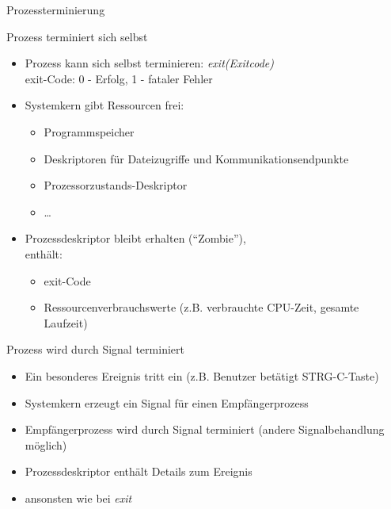 \documentclass[utf8,9pt]{beamer}
\begin{document}
\begin{frame}{Prozessterminierung}{}

  \begin{block}{\small Prozess terminiert sich selbst}
    \begin{itemize}
    \footnotesize
    \item Prozess kann sich selbst terminieren:
      {\em  exit(Exitcode) \/}\\
      exit-Code: 0 - Erfolg, 1 - fataler Fehler
    \item Systemkern gibt Ressourcen frei:
      \begin{itemize}
    \footnotesize
      \item Programmspeicher
      \item Deskriptoren für Dateizugriffe und Kommunikationsendpunkte
      \item Prozessorzustands-Deskriptor
      \item \dots
      \end{itemize}
    \item Prozessdeskriptor bleibt erhalten ("`Zombie"'),\\
      enthält:
      \begin{itemize}
    \footnotesize
      \item exit-Code
      \item Ressourcenverbrauchswerte (z.B. verbrauchte CPU-Zeit,
        gesamte Laufzeit)
      \end{itemize}
    \end{itemize}
  \end{block}

  \begin{block}{\small Prozess wird durch Signal terminiert}
    \begin{itemize}
      \footnotesize
    \item Ein besonderes Ereignis tritt ein (z.B. Benutzer betätigt
      STRG-C-Taste)
    \item Systemkern erzeugt ein Signal für einen Empfängerprozess
    \item Empfängerprozess wird durch Signal terminiert (andere
      Signalbehandlung möglich)
    \item Prozessdeskriptor enthält Details zum Ereignis
    \item ansonsten wie bei {\em exit\/}
    \end{itemize}
  \end{block}
\end{frame}
\end{document}
